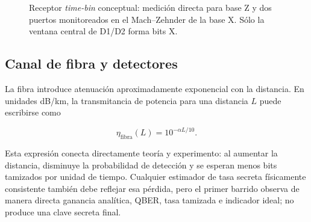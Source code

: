 \begin{figure}[H]
  \centering
  \caption{Receptor \textit{time-bin} conceptual: medición directa para base Z y dos puertos monitoreados en el Mach--Zehnder de la base X. Sólo la ventana central de D1/D2 forma bits X.}
  \label{fig:receptor_timebin}
\end{figure}

\subsection{Canal de fibra y detectores}

La fibra introduce atenuación aproximadamente exponencial con la distancia. En unidades dB/km, la transmitancia de potencia para una distancia \(L\) puede escribirse como

\begin{equation}
  \eta_\text{fibra}(L) = 10^{-\alpha L/10}.
  \label{eq:fiber_loss}
\end{equation}

Esta expresión conecta directamente teoría y experimento: al aumentar la distancia, disminuye la probabilidad de detección y se esperan menos bits tamizados por unidad de tiempo. Cualquier estimador de tasa secreta físicamente consistente también debe reflejar esa pérdida, pero el primer barrido observa de manera directa ganancia analítica, QBER, tasa tamizada e indicador ideal; no produce una clave secreta final.

